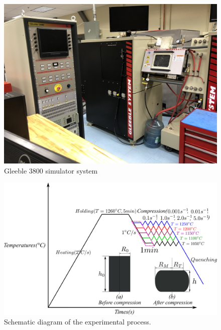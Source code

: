 \documentclass[twoside,english,1p,final,sort&compress]{elsarticle}
\theoremstyle{plain}
\begin{document}
\begin{figure}[!ht]
\centering
\includegraphics[width=0.9\columnwidth]
{newFigures/Gleeble-3}
\caption{Gleeble 3800 simulator system}
\label{fig:Gleeble3800}
\end{figure}
\begin{figure}[!ht]
\centering
\includegraphics[width=0.9\columnwidth]
{newFigures/GleebleDesign}
\caption{Schematic diagram of the experimental process.}
\label{fig:Heating}
\end{figure}
\begin{table}[h!]
\centering{}
\caption{Chemical Composition of the AISI P20 Steel (Weight Percent)}
\end{table}
\end{document}
